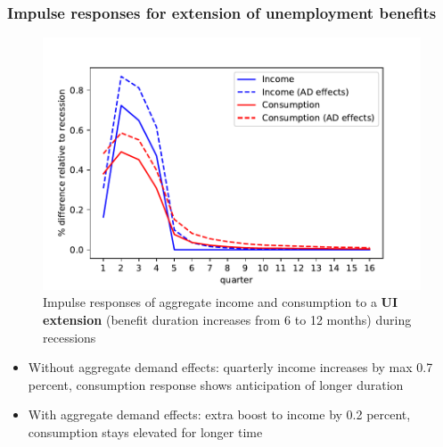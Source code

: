 \documentclass[pdflatex]{beamer}
\begin{document}
\begin{frame}
\frametitle{Impulse responses for extension of unemployment benefits}

	\begin{figure}
		\centering
		\includegraphics[width=0.6\linewidth]{Code/HA-Models/FromPandemicCode/Figures/recession_UI_relrecession}
		\caption{Impulse responses of aggregate income and consumption to a \textbf{UI extension} (benefit duration increases from 6 to 12 months) during recessions}
	\end{figure}
	
	\begin{itemize}
		\item Without aggregate demand effects: quarterly income increases by max 0.7 percent, consumption response shows anticipation of longer duration
		\item With aggregate demand effects: extra boost to income by 0.2 percent, consumption stays elevated for longer time
	\end{itemize}

\end{frame}
\end{document}
